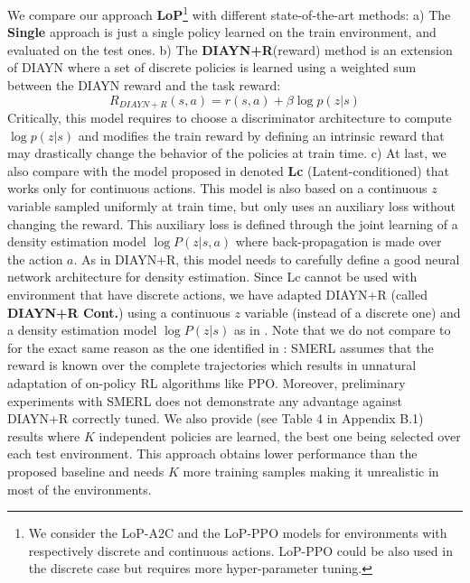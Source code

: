 We compare  our approach \textbf{LoP}\footnote{We consider the LoP-A2C and the LoP-PPO models for environments with respectively discrete and continuous actions. LoP-PPO could be also used in the discrete case but requires more hyper-parameter tuning.} with different state-of-the-art methods:
a) The \textbf{Single} approach is just a single policy learned on the train environment, and evaluated on the test ones. b) The \textbf{DIAYN+R}(reward) method is an extension of DIAYN \citep{diayn} where a set of discrete policies is learned using a weighted sum between the DIAYN reward and the task reward:
\begin{equation}
    R_{DIAYN+R}(s,a) = r(s,a) + \beta \log p(z|s)
\end{equation}
Critically, this model requires to choose a discriminator architecture to compute  $\log p(z|s)$ and modifies the train reward by defining an intrinsic reward that may drastically change the behavior of the policies at train time. c) At last, we also compare with the model proposed in \citep{Tokyo} denoted \textbf{Lc} (Latent-conditioned) that works only for continuous actions. This model is also based on a continuous $z$ variable sampled uniformly at train time, but only uses an auxiliary loss without changing the reward. This auxiliary loss is defined through the joint learning of a density estimation model $\log P(z|s,a)$ where back-propagation is made over the action $a$. As in DIAYN+R, this model needs to carefully define a good neural network architecture for density estimation. Since Lc cannot be used with environment that have discrete actions, we have adapted DIAYN+R (called \textbf{DIAYN+R Cont.}) using a continuous $z$  variable (instead of a discrete one) and a density estimation model $\log P(z|s)$ as in \cite{Tokyo}. Note that we do not compare to \citep{DBLP:conf/nips/KumarKLF20} for the exact same reason as the one identified in \citep{Tokyo}: SMERL assumes that the reward is known over the complete trajectories which results in unnatural adaptation of on-policy RL algorithms like PPO. Moreover, preliminary experiments with SMERL does not demonstrate any advantage against DIAYN+R correctly tuned. We also provide (see Table 4 in Appendix B.1) results where $K$ independent policies are learned, the best one being selected over each test environment. This approach obtains lower performance than the proposed baseline and needs $K$ more training samples making it unrealistic in most of the environments.



